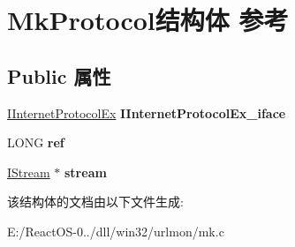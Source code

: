 \hypertarget{struct_mk_protocol}{}\section{Mk\+Protocol结构体 参考}
\label{struct_mk_protocol}
\subsection*{Public 属性}
\begin{DoxyCompactItemize}
\item 
\mbox{\label{struct_mk_protocol_a9db0051a6c8c79fe5c8c00deb1bbfa27}} 
\hyperlink{interface_i_internet_protocol_ex}{I\+Internet\+Protocol\+Ex} {\bfseries I\+Internet\+Protocol\+Ex\+\_\+iface}
\item 
\mbox{\label{struct_mk_protocol_ab7a6a86ae5022d8b0e6a9a9e70f8de87}} 
L\+O\+NG {\bfseries ref}
\item 
\mbox{\label{struct_mk_protocol_aa3ad5ab77c209d466fd68de1064bc98c}} 
\hyperlink{interface_i_stream}{I\+Stream} $\ast$ {\bfseries stream}
\end{DoxyCompactItemize}


该结构体的文档由以下文件生成\+:\begin{DoxyCompactItemize}
\item 
E\+:/\+React\+O\+S-\/0../dll/win32/urlmon/mk.\+c\end{DoxyCompactItemize}

